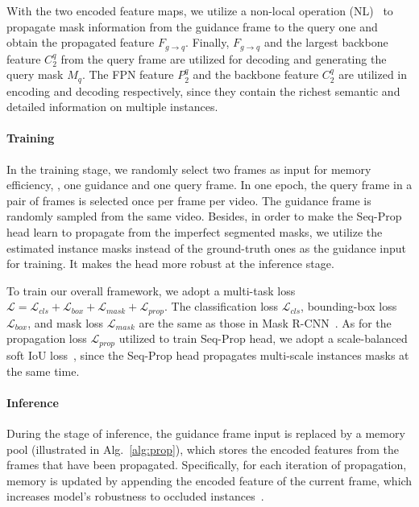 \documentclass[10pt,twocolumn,letterpaper]{article}
\begin{document}
	With the two encoded feature maps, we utilize a non-local operation (NL)~\cite{wang2018non} to propagate mask information from the guidance frame to the query one and obtain the propagated feature $F_{g \to q}$.
	Finally, $F_{g \to q}$ and the largest backbone feature $C_2^q$ from the query frame are utilized for decoding and generating the query mask $M_q$. 
	The FPN feature $P_2^q$ and the backbone feature $C_2^q$ are utilized in encoding and decoding respectively, since they contain the richest semantic and detailed information on multiple instances.
	
	\vspace{-0.1in}
	
	\paragraph{Training}
	In the training stage, we randomly select two frames as input for memory efficiency, \ie, one guidance and one query frame. 
	In one epoch, the query frame in a pair of frames is selected once per frame per video. The guidance frame is randomly sampled from the same video.
	Besides, in order to make the Seq-Prop head learn to propagate from the imperfect segmented masks, we utilize the estimated instance masks instead of the ground-truth ones as the guidance input for training. It makes the head more robust at the inference stage.
	
	To train our overall framework, we adopt a multi-task loss $\mathcal{L}=\mathcal{L}_{cls}+\mathcal{L}_{box}+\mathcal{L}_{mask}+\mathcal{L}_{prop}$. The classification loss $\mathcal{L}_{cls}$, bounding-box loss $\mathcal{L}_{box}$, and mask loss $\mathcal{L}_{mask}$ are the same as those in Mask R-CNN~\cite{he2017mask}. 
	As for the propagation loss $\mathcal{L}_{prop}$ utilized to train Seq-Prop head, we adopt a 
	scale-balanced soft IoU loss~\cite{lin2019agss}, since the Seq-Prop head propagates multi-scale instances masks at the same time.
	
	\vspace{-0.1in}
	
	\paragraph{Inference}
	During the stage of inference, the guidance frame input is replaced by a memory pool (illustrated in Alg.~\ref{alg:prop}), which stores the encoded features from the frames that have been propagated. Specifically, for each iteration of propagation, memory is updated by appending the encoded feature of the current frame, which increases model's robustness to occluded instances~\cite{oh2019video}.
	
\end{document}
